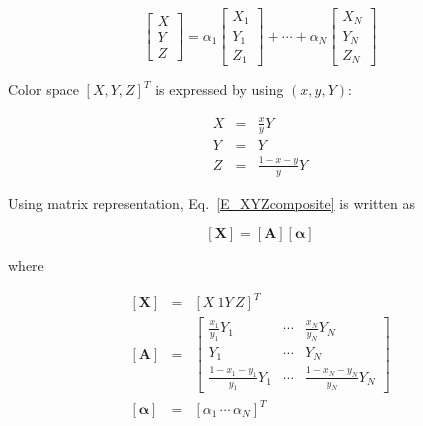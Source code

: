 \documentclass[dvipdfmx,uplatex,a4paper]{article}
\begin{document}
\begin{equation}
  \label{E_XYZcomposite}
  \left[
    \begin{array}{c}
      X \\
      Y \\
      Z
    \end{array}
  \right]
   = \alpha_1
  \left[
    \begin{array}{c}
        X_1 \\
        Y_1 \\
        Z_1
    \end{array}
  \right]
   + \cdots + \alpha_N
  \left[
    \begin{array}{c}
        X_N \\
        Y_N \\
        Z_N
    \end{array}
  \right]
\end{equation}

Color space $[X, Y, Z]^T$ is expressed by using $(x, y, Y)$:

\begin{eqnarray}
  \label{E_xyY2XYZ}
  X & = & \frac{x}{y}  Y \\
  Y & = & Y \\
  Z & = & \frac{1 - x - y}{y} Y
\end{eqnarray}

Using matrix representation, Eq.~\eqref{E_XYZcomposite} is written as

\begin{equation}
  \label{E_X=AY}
  \left[ \boldsymbol{X} \right] =
  \left[ \boldsymbol{A} \right]
  \left[ \boldsymbol{\alpha} \right]
\end{equation}

\noindent
where

\begin{eqnarray}
  \left[ \boldsymbol{X} \right] &=&
  \left[ X \:1 Y \, Z \right]^T \label{E_XYZ^T} \\
%
  \left[ \boldsymbol{A} \right] &=&
  \left[
    \begin{array}{ccc}
      \frac{x_1}{y_1} Y_1 & \cdots & \frac{x_N}{y_N} Y_N \\
      Y_1 & \cdots & Y_N \\
      \frac{1 - x_1 - y_1}{y_1}Y_1 & \cdots & \frac{1 - x_N - y_N}{y_N}Y_N
    \end{array}
  \right] \\
%
  \left[ \boldsymbol{\alpha} \right] &=&
  \left[ \alpha_1\, \cdots\, \alpha_N \right]^T
\end{eqnarray}
\end{document}
